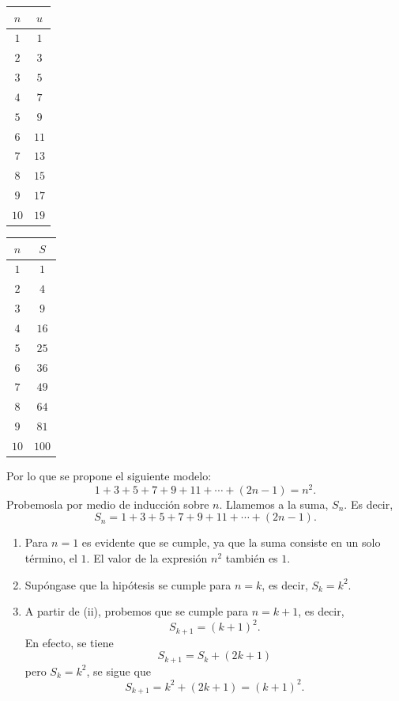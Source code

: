 \begin{center}
    \begin{minipage}{.4\textwidth}
        \centering
        \begin{tabular}{cc}
            \toprule
            $n$ & $u$ \\
            \midrule
            $1$ & $1$ \\
            $2$ & $3$ \\
            $3$ & $5$ \\
            $4$ & $7$ \\
            $5$ & $9$ \\
            $6$ & $11$ \\
            $7$ & $13$ \\
            $8$ & $15$ \\
            $9$ & $17$ \\
            $10$ & $19$ \\
            \bottomrule
        \end{tabular}
    \end{minipage}
    \begin{minipage}{.4\textwidth}
        \centering
        \begin{tabular}{cc}
            \toprule
            $n$ & $S$ \\
            \midrule
            $1$ & $1$ \\
            $2$ & $4$ \\
            $3$ & $9$ \\
            $4$ & $16$ \\
            $5$ & $25$ \\
            $6$ & $36$ \\
            $7$ & $49$ \\
            $8$ & $64$ \\
            $9$ & $81$ \\
            $10$ & $100$ \\
            \bottomrule
        \end{tabular}
    \end{minipage}
\end{center}
Por lo que se propone el siguiente modelo:
$$1 + 3 + 5 + 7 + 9 + 11 + \cdots + (2n - 1) = n^2.$$
Probemosla por medio de inducción sobre $n$. Llamemos a la suma, $S_n$. Es decir,
$$S_n=1+3+5+7+9+11+\cdots +(2n-1).$$
\begin{enumerate}[label=\roman*.]
    \item Para $n = 1$ es evidente que se cumple, ya que la suma consiste en un solo término, el $1$. El valor de la expresión $n^2$ también es $1$.
    \item Supóngase que la hipótesis se cumple para $n = k$, es decir, $S_k = k^2$.
    \item A partir de (ii), probemos que se cumple para $n = k + 1$, es decir,
    $$S_{k+1} = (k+1)^2.$$
    En efecto, se tiene
    $$S_{k+1} = S_k+(2k+1)$$
    pero $S_k = k^2$, se sigue que
    $$S_{k+1} = k^2+(2k+1)=(k+1)^2.$$
\end{enumerate}
